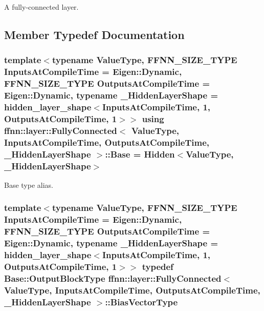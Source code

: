 A fully-\/connected layer. 

\subsection{Member Typedef Documentation}
\hypertarget{classffnn_1_1layer_1_1_fully_connected_ad49d4e88823497be658d01c44eeef3f2}{
\subsubsection[{Base}]{\setlength{\rightskip}{0pt plus 5cm}template$<$typename Value\-Type, F\-F\-N\-N\-\_\-\-S\-I\-Z\-E\-\_\-\-T\-Y\-P\-E Inputs\-At\-Compile\-Time = Eigen\-::\-Dynamic, F\-F\-N\-N\-\_\-\-S\-I\-Z\-E\-\_\-\-T\-Y\-P\-E Outputs\-At\-Compile\-Time = Eigen\-::\-Dynamic, typename \-\_\-\-Hidden\-Layer\-Shape = hidden\-\_\-layer\-\_\-shape$<$\-Inputs\-At\-Compile\-Time, 1, Outputs\-At\-Compile\-Time, 1$>$$>$ using {\bf ffnn\-::layer\-::\-Fully\-Connected}$<$ Value\-Type, Inputs\-At\-Compile\-Time, Outputs\-At\-Compile\-Time, \-\_\-\-Hidden\-Layer\-Shape $>$\-::{\bf Base} =  {\bf Hidden}$<$Value\-Type, \-\_\-\-Hidden\-Layer\-Shape$>$}}\label{classffnn_1_1layer_1_1_fully_connected_ad49d4e88823497be658d01c44eeef3f2}


Base type alias. 

\hypertarget{classffnn_1_1layer_1_1_fully_connected_afd08719c4360bd1447d1108396b07e57}{
\subsubsection[{Bias\-Vector\-Type}]{\setlength{\rightskip}{0pt plus 5cm}template$<$typename Value\-Type, F\-F\-N\-N\-\_\-\-S\-I\-Z\-E\-\_\-\-T\-Y\-P\-E Inputs\-At\-Compile\-Time = Eigen\-::\-Dynamic, F\-F\-N\-N\-\_\-\-S\-I\-Z\-E\-\_\-\-T\-Y\-P\-E Outputs\-At\-Compile\-Time = Eigen\-::\-Dynamic, typename \-\_\-\-Hidden\-Layer\-Shape = hidden\-\_\-layer\-\_\-shape$<$\-Inputs\-At\-Compile\-Time, 1, Outputs\-At\-Compile\-Time, 1$>$$>$ typedef {\bf Base\-::\-Output\-Block\-Type} {\bf ffnn\-::layer\-::\-Fully\-Connected}$<$ Value\-Type, Inputs\-At\-Compile\-Time, Outputs\-At\-Compile\-Time, \-\_\-\-Hidden\-Layer\-Shape $>$\-::{\bf Bias\-Vector\-Type}}}\label{classffnn_1_1layer_1_1_fully_connected_afd08719c4360bd1447d1108396b07e57}


